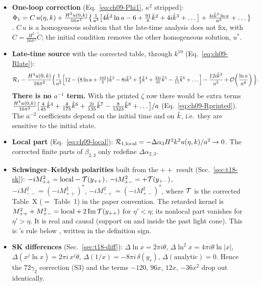 \begin{itemize}[leftmargin=14pt,itemsep=2pt]
\item[\textbf{E2}] \textbf{One-loop correction} (Eq.~\eqref{eq:ch09-Phi1}, $\kappa^2$ stripped):
$\Phi_1=C\,u(\eta,k)+\frac{H^2u(0,k)}{16\pi^2}\big\{\frac1{a^2}\big[4\hat k^2\ln a-6+\tfrac{91}{6}\hat k^2+4i\hat k^3+\ldots\big]+\frac{4i\hat k^3\ln a}{a^3}+\ldots\big\}$.
$C\,u$ is a homogeneous solution that the late-time analysis does not fix, with $C=\tfrac{H^2}{16\pi^2}\tilde C$; the initial condition removes the other
homogeneous solution, $u^*$.
\item[\textbf{E3}] \textbf{Late-time source} with the corrected table, through $k^{10}$ (Eq.~\eqref{eq:ch09-Rlate}):
\[
\mathcal R_1=\frac{H^4u(0,k)}{16\pi^2}\Big\{\frac1{a^2}\Big[12-\big(8\ln a+\tfrac{103}{3}\big)\hat k^2-8i\hat k^3+\tfrac83\hat k^4+\tfrac{32i}{45}\hat k^5
-\tfrac2{15}\hat k^6+\ldots\Big]-\frac{12i\hat k^3}{a^3}+\mathcal{O}\!\left(\frac{\ln a}{a^4}\right)\Big\}.
\]
\textbf{There is no $a^{-1}$ term.} With the printed $\zeta$ row there would be extra terms
$\frac{H^4u(0,k)}{16\pi^2}\big[\tfrac{4}{45}\hat k^4+\tfrac{4}{175}\hat k^6+\tfrac{2i}{135}\hat k^7-\tfrac{8}{1323}\hat k^8+\ldots\big]/a$
(Eq.~\eqref{eq:ch09-Rprinted}). The $a^{-2}$ coefficients depend on the initial time and on $\hat k$, i.e.\ they are sensitive to the initial state.
\item[\textbf{E4}] \textbf{Local part} (Eq.~\eqref{eq:ch09-local}): $\mathcal R_{1,\rm local}=-\Delta\alpha_3H^2k^2u(\eta,k)/a^2\to0$. The corrected
finite parts of $\beta_{2,3}$ only redefine $\Delta\alpha_{2,3}$.
\item[\textbf{E5}] \textbf{Schwinger--Keldysh polarities} built from the $++$ result (Sec.~\ref{sec:t18-sk}): $-iM^2_{++}=\text{local}-\mathcal{T}(y_{++})$,
$-iM^2_{+-}=+\mathcal{T}(y_{+-})$, $-iM^2_{--}=(-iM^2_{++})^*$, $-iM^2_{-+}=(-iM^2_{+-})^*$, where $\mathcal{T}$ is the corrected Table~X ($=$ \PII{} Table~1) in the
paper convention. The retarded kernel is $M^2_{++}+M^2_{+-}=\text{local}+2\,\mathrm{Im}\,\mathcal{T}(y_{++})$ for $\eta'<\eta$; its nonlocal part vanishes for
$\eta'>\eta$. It is real and causal (support on and inside the past light cone). This is \PII's rule below , written in the definition sign.
\item[\textbf{E6}] \textbf{SK differences} (Sec.~\ref{sec:t18-diff}): $\Delta\ln x=2\pi i\theta$, $\Delta\ln^2x=4\pi i\theta\ln|x|$,
$\Delta(x^j\ln x)=2\pi i\,x^j\theta$, $\Delta(1/x)=-8\pi i\,\delta(y_r)$, $\Delta(\text{analytic})=0$. Hence the $72\gamma_2$ correction (S3) and the
terms $-120$, $96x$, $12x$, $-36x^2$ drop out identically.

\end{itemize}
